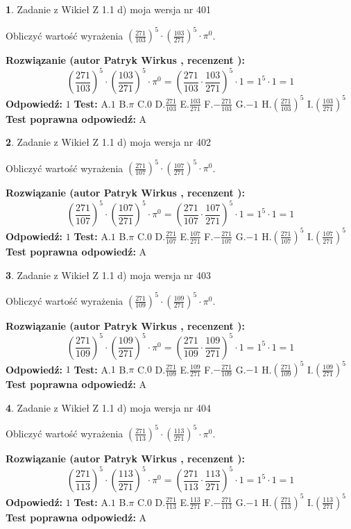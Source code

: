 \documentclass[12pt, a4paper]{article}
\theoremstyle{definition} %
\newtheorem{zad}{}
\newcommand{\zadStart}[1]{\begin{zad}#1\newline}
\newcommand{\zadStop}{\end{zad}}
\newcommand{\rozwStart}[2]{\noindent \textbf{Rozwiązanie (autor #1 , recenzent #2): }\newline}
\newcommand{\rozwStop}{\newline}
\newcommand{\odpStart}{\noindent \textbf{Odpowiedź:}\newline}
\newcommand{\odpStop}{\newline}
\newcommand{\testStart}{\noindent \textbf{Test:}\newline}
\newcommand{\testStop}{\newline}
\newcommand{\kluczStart}{\noindent \textbf{Test poprawna odpowiedź:}\newline}
\newcommand{\kluczStop}{\newline}
\begin{document}
\zadStart{Zadanie z Wikieł Z 1.1 d) moja wersja nr 401}

Obliczyć wartość wyrażenia $(\frac{271}{103})^{5} \cdot (\frac{103}{271})^{5} \cdot \pi^{0}$.
\zadStop
\rozwStart{Patryk Wirkus}{}
$$(\frac{271}{103})^{5} \cdot (\frac{103}{271})^{5} \cdot \pi^{0} = (\frac{271}{103} \cdot \frac{103}{271})^{5} \cdot 1 = 1^{5} \cdot 1 = 1$$
\rozwStop
\odpStart
$1$
\odpStop
\testStart
A.$1$ B.$\pi$ C.$0$ D.$\frac{271}{103}$ E.$\frac{103}{271}$
F.$-\frac{271}{103}$ G.$-1$
H.$(\frac{271}{103})^{5}$
I.$(\frac{103}{271})^{5}$
\testStop
\kluczStart
A
\kluczStop



\zadStart{Zadanie z Wikieł Z 1.1 d) moja wersja nr 402}

Obliczyć wartość wyrażenia $(\frac{271}{107})^{5} \cdot (\frac{107}{271})^{5} \cdot \pi^{0}$.
\zadStop
\rozwStart{Patryk Wirkus}{}
$$(\frac{271}{107})^{5} \cdot (\frac{107}{271})^{5} \cdot \pi^{0} = (\frac{271}{107} \cdot \frac{107}{271})^{5} \cdot 1 = 1^{5} \cdot 1 = 1$$
\rozwStop
\odpStart
$1$
\odpStop
\testStart
A.$1$ B.$\pi$ C.$0$ D.$\frac{271}{107}$ E.$\frac{107}{271}$
F.$-\frac{271}{107}$ G.$-1$
H.$(\frac{271}{107})^{5}$
I.$(\frac{107}{271})^{5}$
\testStop
\kluczStart
A
\kluczStop



\zadStart{Zadanie z Wikieł Z 1.1 d) moja wersja nr 403}

Obliczyć wartość wyrażenia $(\frac{271}{109})^{5} \cdot (\frac{109}{271})^{5} \cdot \pi^{0}$.
\zadStop
\rozwStart{Patryk Wirkus}{}
$$(\frac{271}{109})^{5} \cdot (\frac{109}{271})^{5} \cdot \pi^{0} = (\frac{271}{109} \cdot \frac{109}{271})^{5} \cdot 1 = 1^{5} \cdot 1 = 1$$
\rozwStop
\odpStart
$1$
\odpStop
\testStart
A.$1$ B.$\pi$ C.$0$ D.$\frac{271}{109}$ E.$\frac{109}{271}$
F.$-\frac{271}{109}$ G.$-1$
H.$(\frac{271}{109})^{5}$
I.$(\frac{109}{271})^{5}$
\testStop
\kluczStart
A
\kluczStop



\zadStart{Zadanie z Wikieł Z 1.1 d) moja wersja nr 404}

Obliczyć wartość wyrażenia $(\frac{271}{113})^{5} \cdot (\frac{113}{271})^{5} \cdot \pi^{0}$.
\zadStop
\rozwStart{Patryk Wirkus}{}
$$(\frac{271}{113})^{5} \cdot (\frac{113}{271})^{5} \cdot \pi^{0} = (\frac{271}{113} \cdot \frac{113}{271})^{5} \cdot 1 = 1^{5} \cdot 1 = 1$$
\rozwStop
\odpStart
$1$
\odpStop
\testStart
A.$1$ B.$\pi$ C.$0$ D.$\frac{271}{113}$ E.$\frac{113}{271}$
F.$-\frac{271}{113}$ G.$-1$
H.$(\frac{271}{113})^{5}$
I.$(\frac{113}{271})^{5}$
\testStop
\kluczStart
A
\kluczStop
\end{document}
